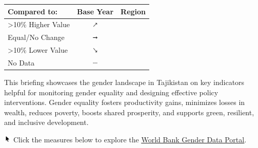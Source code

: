 \documentclass[
]{article}
\author{}
\date{\vspace{-2.5em}}
\begin{document}

\begin{table}\begingroup\fontsize{8}{10}\selectfont

\begin{tabular}[t]{lcl}

\textbf{Compared to:} & \textbf{Base Year} & \textbf{Region}\\
\midrule
>10\% Higher Value & \includegraphics[width=0.1in, height=0.1in]{upicon.png} & \cellcolor[HTML]{21908C}{}\\
Equal/No Change & \includegraphics[width=0.1in, height=0.1in]{righticon.png} & \cellcolor[HTML]{34608D}{}\\
>10\% Lower Value & \includegraphics[width=0.1in, height=0.1in]{downicon.png} & \cellcolor[HTML]{482576}{}\\
No Data & \includegraphics[width=0.1in, height=0.1in]{naicon.png} & \cellcolor{gray}{}\\

\end{tabular}
\endgroup{}\end{table}

\begin{minipage}[t][1.7cm][t]{12cm}
\fontsize{9}{8}\selectfont\raggedright
This briefing showcases the gender landscape in Tajikistan on key indicators helpful for monitoring gender equality and designing effective policy interventions. Gender equality fosters productivity gains, minimizes losses in wealth, reduces poverty, boosts shared prosperity, and supports green, resilient, and inclusive development. 

\includegraphics[width=10pt]{pointer.png} Click the measures below to explore the \underline{\href{https://genderdata.worldbank.org/}{World Bank Gender Data Portal}}.
\end{minipage}
\vspace{6pt}
\end{document}
